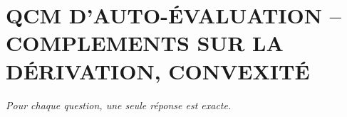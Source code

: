 
\section*{\textcolor{chapcolor}{\MakeUppercase{QCM d'auto-évaluation -- Complements sur la dérivation, convexité}}}

\begin{center}
\textit{Pour chaque question, une seule réponse est exacte.}
\end{center}

